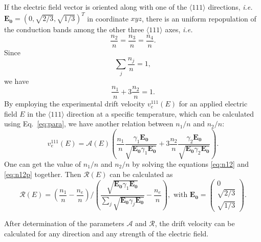 If the electric field vector is oriented along with one of the $\langle111\rangle$ directions, \textit{i.e.} $\mathbf{E_{0}} = (0,\sqrt{2/3},\sqrt{1/3})^{T}$ in coordinate $xyz$, there is an uniform repopulation of the conduction bands among the other three $\langle111\rangle$ axes, \textit{i.e.}
\begin{equation}
  \label{eq:n111}
  \frac{n_{2}}{n} = \frac{n_{3}}{n} = \frac{n_{4}}{n}.
\end{equation}
Since
\begin{equation}
  \label{eq:nsum}
  \displaystyle \sum_{j}\frac{n_{j}}{n} = 1,
\end{equation}
we have
\begin{equation}
  \label{eq:n12}
  \frac{n_{1}}{n} + 3\frac{n_{2}}{n}= 1.
\end{equation}
By employing the experimental drift velocity $v_{e}^{111}(E)$ for an applied electric field $E$ in the $\langle111\rangle$ direction at a specific temperature, which can be calculated using Eq.~\ref{eq:para}, we have another relation between $n_{1}/n$ and $n_{2}/n$:
\begin{equation}
  \label{eq:n12p}
  v_{e}^{111}(E) =  \mathcal{A}(E) \left(  \frac{n_{1}}{n} \frac{\gamma_{1}\mathbf{E_{0}}}         {\sqrt{\mathbf{E_{0}}\gamma_{1}\mathbf{E_{0}}}} +  3\frac{n_{2}}{n} \frac{\gamma_{2}\mathbf{E_{0}}}         {\sqrt{\mathbf{E_{0}}\gamma_{2}\mathbf{E_{0}}}} \right).
\end{equation}
One can get the value of $n_{1}/n$ and $n_{2}/n$ by solving the equations \ref{eq:n12} and \ref{eq:n12p} together. Then $\mathcal{R}(E)$ can be calculated as
\begin{equation}
  \label{eq:re}
  \mathcal{R}(E) = \left( \frac{n_{1}}{n} - \frac{n_{e}}{n} \right) / \left( \frac{\sqrt{\mathbf{E_{0}}\gamma_{1}\mathbf{E_{0}}}}
    {\sum_{j}\sqrt{\mathbf{E_{0}}\gamma_{j}\mathbf{E_{0}}}} -                           \frac{n_{e}}{n} \right), \mbox{ with } \mathbf{E_{0}} = \left( \begin{array}{c} 
  0\\ \sqrt{2/3}\\\sqrt{1/3} \end{array} \right).
\end{equation}

After determination of the parameters $\mathcal{A}$ and $\mathcal{R}$, the drift velocity can be calculated for any direction and any strength of the electric field.

